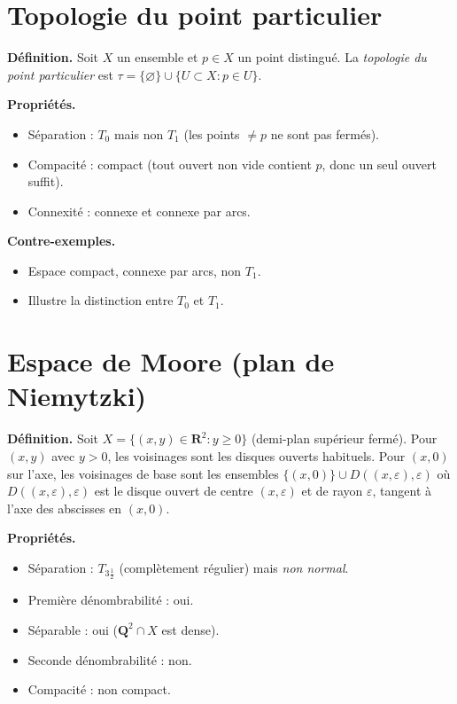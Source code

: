 \documentclass[12pt,a4paper,openany]{book}
\theoremstyle{definition}
\theoremstyle{cours}
\theoremstyle{coursnormal}
\begin{document}
\section{Topologie du point particulier}
\label{app:point-particulier}

\textbf{Définition.} Soit $X$ un ensemble et $p\in X$ un point
distingué. La \emph{topologie du point particulier} est
$\tau=\{\varnothing\}\cup\{U\subset X: p\in U\}$.

\textbf{Propriétés.}
\begin{itemize}
  \item Séparation : $T_0$ mais non $T_1$ (les points $\neq p$ ne
    sont pas fermés).
  \item Compacité : compact (tout ouvert non vide contient $p$, donc
    un seul ouvert suffit).
  \item Connexité : connexe et connexe par arcs.
\end{itemize}

\textbf{Contre-exemples.}
\begin{itemize}
  \item Espace compact, connexe par arcs, non $T_1$.
  \item Illustre la distinction entre $T_0$ et $T_1$.
\end{itemize}

\section{Espace de Moore (plan de Niemytzki)}
\label{app:niemytzki}

\textbf{Définition.} Soit $X=\{(x,y)\in\mathbf{R}^2:y\ge 0\}$
(demi-plan supérieur fermé). Pour $(x,y)$ avec $y>0$, les voisinages
sont les disques ouverts habituels. Pour $(x,0)$ sur l'axe, les
voisinages de base sont les ensembles $\{(x,0)\}\cup D((x,\varepsilon),
\varepsilon)$ où $D((x,\varepsilon),\varepsilon)$ est le disque ouvert
de centre $(x,\varepsilon)$ et de rayon $\varepsilon$, tangent à
l'axe des abscisses en $(x,0)$.

\textbf{Propriétés.}
\begin{itemize}
  \item Séparation : $T_{3\frac{1}{2}}$ (complètement régulier) mais
    \emph{non normal}.
  \item Première dénombrabilité : oui.
  \item Séparable : oui ($\mathbf{Q}^2\cap X$ est dense).
  \item Seconde dénombrabilité : non.
  \item Compacité : non compact.
\end{itemize}
\end{document}
